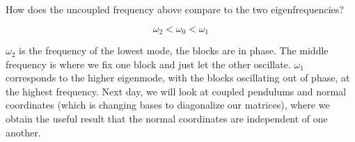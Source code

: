 \documentclass[../PHYS306Notes.tex]{subfiles}
\begin{document}
\begin{p}
How does the uncoupled frequency above compare to the two eigenfrequencies?
\end{p}
\begin{s}
\[\omega_2 < \omega_0 < \omega_1\]
\end{s}
\noindent$\omega_2$ is the frequency of the lowest mode, the blocks are in phase. The middle frequency is where we fix one block and just let the other oscillate. $\omega_1$ corresponds to the higher eigenmode, with the blocks oscillating out of phase, at the highest frequency. Next day, we will look at coupled pendulums and normal coordinates (which is changing bases to diagonalize our matrices), where we obtain the useful result that the normal coordinates are independent of one another.
\end{document}
